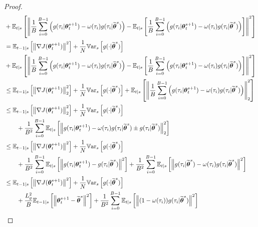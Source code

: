 \begin{proof}
\begin{align}
	&+ 
	\mathbb{E}_{t\vert s}\left[\left\|
	\frac{1}{B}\sum_{i=0}^{B-1}\left(
	g(\tau_i\vert\vtheta_t^{s+1}) -
	\omega(\tau_i)g(\tau_i\vert\wt{\vtheta}^s)\right)
	- \Ets{
		\frac{1}{B}\sum_{i=0}^{B-1}\left(
		g(\tau_i\vert\vtheta_t^{s+1}) -
		\omega(\tau_i)g(\tau_i\vert\wt{\vtheta}^s)\right)}\right\|^2\right] 
	\label{neweq:2}\\
	&= \Ets[t-1]{\norm[]{\gradJ{\vtheta_t^{s+1}}}^2} 
	+\frac{1}{N}\Vars{g(\cdot\vert\wt{\vtheta}^s)}
	\nonumber\\
	&+ 
	\mathbb{E}_{t\vert s}\left[\left\|
	\frac{1}{B}\sum_{i=0}^{B-1}\left(
	g(\tau_i\vert\vtheta_t^{s+1}) -
	\omega(\tau_i)g(\tau_i\vert\wt{\vtheta}^s)\right)
	- \Ets{
		\frac{1}{B}\sum_{i=0}^{B-1}\left(
		g(\tau_i\vert\vtheta_t^{s+1}) -
		\omega(\tau_i)g(\tau_i\vert\wt{\vtheta}^s)\right)}\right\|^2\right] 
	\label{eq:1}\\%
	&\leq \Ets[t-1]{\norm[2]{\gradJ{\vtheta_t^{s+1}}}^2} 
	+\frac{1}{N}\Vars{g(\cdot\vert\wt{\vtheta}^s)} 
	+\Ets{\norm[2]{
			\frac{1}{B}\sum_{i=0}^{B-1}\left(
			g(\tau_i\vert\vtheta_t^{s+1}) -
			\omega(\tau_i)g(\tau_i\vert\wt{\vtheta}^s)\right)}^2} \label{eq:2}\\
	&\leq \Ets[t-1]{\norm[2]{\gradJ{\vtheta_t^{s+1}}}^2} 
	+\frac{1}{N}\Vars{g(\cdot\vert\wt{\vtheta}^s)}
     \nonumber\\ 	&\qquad
	+ \frac{1}{B^2}\sum_{i=0}^{B-1}
	\Ets{\norm[2]{
			g(\tau_i\vert\vtheta_t^{s+1}) -
			\omega(\tau_i)g(\tau_i\vert\wt{\vtheta}^s) \pm g(\tau_i|\wt{\vtheta}^s) }^2} \nonumber\\
	&\leq \Ets[t-1]{\norm[]{\gradJ{\vtheta_t^{s+1}}}^2} 
	+\frac{1}{N}\Vars{g(\cdot\vert\wt{\vtheta}^s)}
	\nonumber\\
	&\qquad+
	\frac{1}{B^2}\sum_{i=0}^{B-1}
	\Ets{\norm[]{g(\tau_i\vert\vtheta_t^{s+1})
			-g(\tau_i\vert\wt{\vtheta}^s)}^2} 
	+\frac{1}{B^2}\sum_{i=0}^{B-1}
	\Ets{\norm[]{g(\tau_i\vert\wt{\vtheta}^s) 
			-\omega(\tau_i)g(\tau_i\vert\wt{\vtheta}^s)}^2} \nonumber\\
	&\leq \Ets[t-1]{\norm[]{\gradJ{\vtheta_t^{s+1}}}^2} 
	+\frac{1}{N}\Vars{g(\cdot\vert\wt{\vtheta}^s)}
	\nonumber\\
	&\qquad
	+\frac{L_g^2}{B}\Ets[t-1]{\norm[]{\vtheta_t^{s+1}-\wt{\vtheta}^s}^2}
	+
	\frac{1}{B^2}\sum_{i=0}^{B-1}
	\Ets{\norm[]{(1 
			-\omega(\tau_i))g(\tau_i\vert\wt{\vtheta}^s)}^2} \label{eq:3}\\

\end{align}
\end{proof}
